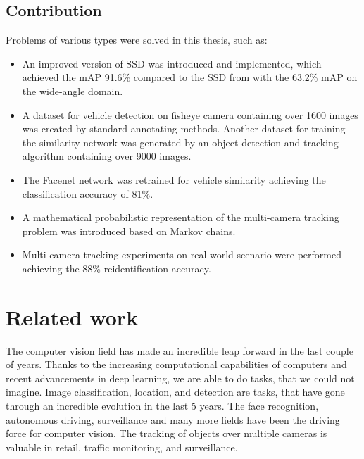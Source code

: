 \documentclass[a4paper,11pt,titlepage,twoside]{article}
\numberwithin{figure}{section}
\begin{document}
\subsection{Contribution}

Problems of various types were solved in this thesis, such as:

\begin{itemize}
\item An improved version of SSD \cite{liu2016ssd} was introduced and implemented, which achieved the mAP 91.6\% compared to the SSD from \cite{liu2016ssd} with the 63.2\% mAP on the wide-angle domain.

\item A dataset for vehicle detection on fisheye camera containing over 1600 images was created by standard annotating methods. Another dataset for training the similarity network was generated by an object detection and tracking algorithm containing over 9000 images.

\item The Facenet \cite{schroff2015facenet} network was retrained for vehicle similarity achieving the classification accuracy of 81\%.

\item A mathematical probabilistic representation of the multi-camera tracking problem was introduced based on Markov chains.

\item Multi-camera tracking experiments on real-world scenario were performed achieving the 88\% reidentification accuracy.

\end{itemize}

\clearpage
\section{Related work}
\label{sec:related_work}

The computer vision field has made an incredible leap forward in the last couple of years. Thanks to the increasing computational capabilities of computers and recent advancements in deep learning, we are able to do tasks, that we could not imagine. Image classification, location, and detection are tasks, that have gone through an incredible evolution in the last 5 years. The face recognition, autonomous driving, surveillance and many more fields have been the driving force for computer vision. The tracking of objects over multiple cameras is valuable in retail, traffic monitoring, and surveillance. 
\end{document}
